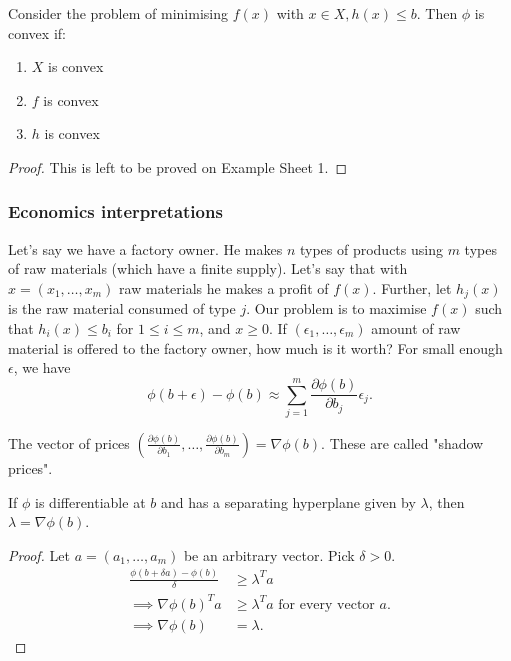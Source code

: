 \documentclass[egregdoesnotlikesansseriftitles,a4paper]{scrartcl}
\begin{document}
\begin{theorem}
	 Consider the problem of minimising $f (x)$ with $x \in X, h (x)\leq b$. Then $\phi$ is convex if: 
	 \begin{enumerate}
		 \item $X$ is convex
		 \item $f$ is convex
		 \item $h$ is convex
	 \end{enumerate}
\end{theorem}
\begin{proof}
	 This is left to be proved on Example Sheet 1.
\end{proof}
\subsubsection{Economics interpretations}
Let's say we have a factory owner. He makes $n$ types of products using $m$ types of raw materials (which have a finite supply). Let's say that with $x=(x_1,\ldots ,x_m)$ raw materials he makes a profit of $f (x)$.\newline 
Further, let $h_j (x)$ is the raw material consumed of type $j$. Our problem is to maximise $f (x)$ such that $h_i (x) \leq b_i$ for $1 \leq i \leq m$, and $x \geq 0.$\newline 
If $(\epsilon_1,\ldots , \epsilon_m)$ amount of raw material is offered to the factory owner, how much is it worth? For small enough $\epsilon $, we have 
\[\phi (b+\epsilon )-\phi (b)\approx \sum_{j=1}^{m}\frac{\partial \phi (b)}{\partial b_j} \epsilon_j.\]

The vector of prices $(\frac{\partial \phi (b)}{\partial b_1} ,\ldots , \frac{\partial \phi (b)}{\partial b_m} )=\nabla \phi (b)$. These are called "shadow prices".

\begin{theorem}
	 If $\phi$ is differentiable at $b$ and has a separating hyperplane given by $\lambda$, then $\lambda=\nabla \phi (b)$.
\end{theorem}
\begin{proof}
	 Let $a= (a_1,\ldots , a_m)$ be an arbitrary vector. Pick $\delta>0$.
	 \begin{equation*}
		  \begin{split}
			  \frac{\phi (b+\delta a)- \phi (b)}{\delta}&\geq \lambda^T a\\
			  \implies \nabla \phi (b)^T a &\geq \lambda^T a \text{ for every vector } a.\\
			  \implies \nabla \phi (b)&=\lambda.
		  \end{split}
	 \end{equation*} 
\end{proof}
\end{document}
